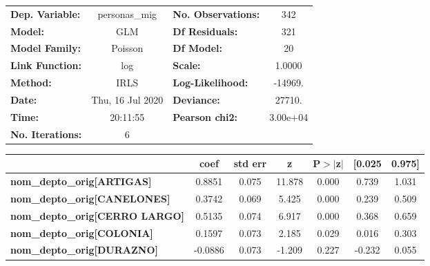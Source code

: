 \begin{center}
\begin{tabular}{lclc}
\toprule
\textbf{Dep. Variable:}                   &  personas\_mig   & \textbf{  No. Observations:  } &      342    \\
\textbf{Model:}                           &       GLM        & \textbf{  Df Residuals:      } &      321    \\
\textbf{Model Family:}                    &     Poisson      & \textbf{  Df Model:          } &       20    \\
\textbf{Link Function:}                   &       log        & \textbf{  Scale:             } &    1.0000   \\
\textbf{Method:}                          &       IRLS       & \textbf{  Log-Likelihood:    } &   -14969.   \\
\textbf{Date:}                            & Thu, 16 Jul 2020 & \textbf{  Deviance:          } &    27710.   \\
\textbf{Time:}                            &     20:11:55     & \textbf{  Pearson chi2:      } &  3.00e+04   \\
\textbf{No. Iterations:}                  &        6         & \textbf{                     } &             \\
\bottomrule
\end{tabular}
\begin{tabular}{lcccccc}
                                          & \textbf{coef} & \textbf{std err} & \textbf{z} & \textbf{P$> |$z$|$} & \textbf{[0.025} & \textbf{0.975]}  \\
\midrule
\textbf{nom\_depto\_orig[ARTIGAS]}        &       0.8851  &        0.075     &    11.878  &         0.000        &        0.739    &        1.031     \\
\textbf{nom\_depto\_orig[CANELONES]}      &       0.3742  &        0.069     &     5.425  &         0.000        &        0.239    &        0.509     \\
\textbf{nom\_depto\_orig[CERRO LARGO]}    &       0.5135  &        0.074     &     6.917  &         0.000        &        0.368    &        0.659     \\
\textbf{nom\_depto\_orig[COLONIA]}        &       0.1597  &        0.073     &     2.185  &         0.029        &        0.016    &        0.303     \\
\textbf{nom\_depto\_orig[DURAZNO]}        &      -0.0886  &        0.073     &    -1.209  &         0.227        &       -0.232    &        0.055     \\

\end{tabular}
\end{center}
